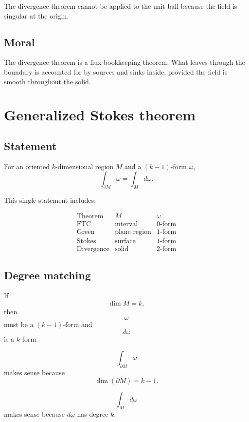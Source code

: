 The divergence theorem cannot be applied to the unit ball because the field is singular
at the origin.

\subsection*{Moral}

The divergence theorem is a flux bookkeeping theorem.  What leaves through the
boundary is accounted for by sources and sinks inside, provided the field is smooth
throughout the solid.

\section{Generalized Stokes theorem}
\label{app:F.7}

\subsection*{Statement}

For an oriented \(k\)-dimensional region \(M\) and a \((k-1)\)-form \(\omega\),
\[
\boxed{
    \int_{\partial M}\omega
    =
    \int_M d\omega.
}
\]

This single statement includes:

\[
\begin{array}{c|c|c}
\text{Theorem} & M & \omega \\ \hline
\text{FTC} & \text{interval} & 0\text{-form}\\[1mm]
\text{Green} & \text{plane region} & 1\text{-form}\\[1mm]
\text{Stokes} & \text{surface} & 1\text{-form}\\[1mm]
\text{Divergence} & \text{solid} & 2\text{-form}
\end{array}
\]

\subsection*{Degree matching}

If
\[
    \dim M=k,
\]
then
\[
    \omega
\]
must be a \((k-1)\)-form and
\[
    d\omega
\]
is a \(k\)-form.

\[
\boxed{
    \int_{\partial M}\omega
}
\]
makes sense because
\[
    \dim(\partial M)=k-1.
\]

\[
\boxed{
    \int_M d\omega
}
\]
makes sense because \(d\omega\) has degree \(k\).

